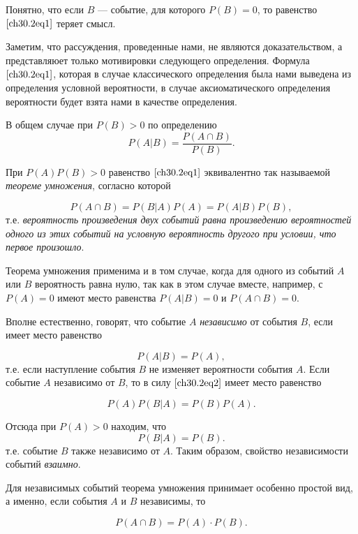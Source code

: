 Понятно, что если $B$ --- событие, для которого $P(B)=0$, то равенство~$\eqref{ch30.2eq1}$ теряет смысл.

Заметим, что рассуждения, проведенные нами, не являются доказательством, а представляюет только мотивировки следующего определения.
Формула $\eqref{ch30.2eq1}$, которая в случае классического определения была нами выведена из определения условной вероятности, в случае аксиоматического определения вероятности будет взята нами в качестве определения. 
\begin{defn} В общем случае при $P(B) > 0$ по определению
$$
P(A|B) = \frac{P(A\cap B)}{P(B)}.
$$
\end{defn}

При $P(A)P(B) > 0$ равенство $\eqref{ch30.2eq1}$ эквивалентно так называемой \textit{теореме умножения}, согласно которой

\begin{equation} \label{ch30.2eq2}
P(A\cap B) = P(B|A)P(A) = P(A|B)P(B),
\end{equation}
т.е. \textit{вероятность произведения двух событий равна произведению вероятностей одного из этих событий на условную вероятность другого при условии, что первое произошло}.

Теорема умножения применима и в том случае, когда для одного из событий $A$ или $B$ вероятность равна нулю, так как в этом случае вместе, например, с $P(A) = 0$ имеют место равенства $P(A|B) = 0$ и $P(A\cap B) = 0$.

Вполне естественно, говорят, что событие $A$ \textit{независимо} от события $B$, если имеет место равенство

\begin{equation} \label{ch30.2eq3}
P(A|B) = P(A),
\end{equation}
т.е. если наступление события $B$ не изменяет вероятности события $A$. Если событие $A$ независимо от $B$, то в силу $\eqref{ch30.2eq2}$ имеет место равенство

$$
P(A)P(B|A) = P(B)P(A).
$$

Отсюда при $P(A) > 0$ находим, что
\begin{equation} \label{ch30.2eq4}
P(B|A) = P(B).
\end{equation}
т.е. событие $B$ также независимо от $A$. Таким образом, свойство независимости событий \textit{взаимно}.

Для независимых событий теорема умножения принимает особенно простой вид, а именно, если события $A$ и $B$ независимы, то

$$
P(A\cap B) = P(A) \cdot P(B).
$$

